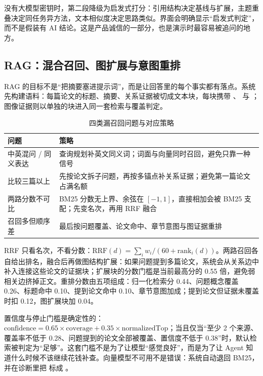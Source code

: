没有大模型密钥时，第二段降级为启发式打分：引用结构决定基线与扩展，主题重叠决定同任务异方法，文本相似度决定思路类似。界面会明确显示“启发式判定”，而不是假装有 AI 结论。这是产品诚信的一部分，也是演示时最容易被追问的地方。

\subsection{RAG：混合召回、图扩展与意图重排}

RAG 的目标不是“把摘要塞进提示词”，而是让回答里的每个事实都有落点。系统先构建语料：每篇论文的标题、摘要、关系证据被切成文本块，每块携带 、 与 ；图像证据则以单独的块进入同一套检索与覆盖判定。

\begin{table}[htbp]
  \centering
  \small
  \caption{四类漏召回问题与对应策略}
  \label{tab:rag-problems}
  \begin{tabularx}{\textwidth}{L{4.2cm}Y}
    \toprule
\textbf{问题} & \textbf{策略} \\
    \midrule
    中英混问 / 同义表达 & 查询规划补英文同义词；词面与向量同时召回，避免只靠一种信号 \\
    比较三篇以上 & 先按论文拆子问题，再按多锚点补关系证据；避免第一篇论文占满名额 \\
    两路分数不可比 & BM25 分数无上界、余弦在 $[-1,1]$，直接相加会被 BM25 支配；先变名次，再用 RRF 融合 \\
    召回多但顺序差 & 最后按问题覆盖、论文命中、章节意图与图证据重排 \\
    \bottomrule
  \end{tabularx}
\end{table}

RRF 只看名次，不看分数：$\mathrm{RRF}(d)=\sum_i w_i/(60+\mathrm{rank}_i(d))$。两路召回各自给出排名，融合后再做图结构扩展：如果问题提到多篇论文，系统会从关系边中补入连接这些论文的证据块；扩展块的分数门槛是当前最高分的 0.55 倍，避免弱相关边挤掉正文。重排分数由五项组成：归一化检索分 0.44、问题概念覆盖 0.26、标题命中 0.10、提到论文命中 0.10、章节意图加成；提到论文但证据未覆盖时扣 0.12，图扩展块加 0.04。

置信度与停止门槛是确定性的：$\text{confidence}=0.65\times\text{coverage}+0.35\times\text{normalizedTop}$；当且仅当“至少 2 个来源、覆盖率不低于 0.28、问题提到的论文全部被覆盖、置信度不低于 0.38”时，默认检索被判定为“足够”。这套门槛不是为了让模型“感觉良好”，而是为了让 Agent 知道什么时候不该继续花钱补查。向量模型不可用不是错误：系统自动退回 BM25，并在诊断里把  标成 。

